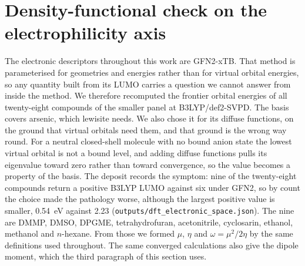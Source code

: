 \documentclass[11pt,a4paper]{article}
\begin{document}
\section{Density-functional check on the electrophilicity axis}
\label{meth:dft}

The electronic descriptors throughout this work are GFN2-xTB. That method is
parameterised for geometries and energies rather than for virtual orbital
energies, so any quantity built from its LUMO carries a question we cannot
answer from inside the method. We therefore recomputed the frontier orbital
energies of all twenty-eight compounds of the smaller panel at
B3LYP/def2-SVPD. The basis covers arsenic, which lewisite needs. We also
chose it for its diffuse functions, on the ground that virtual orbitals need
them, and that ground is the wrong way round. For a neutral closed-shell
molecule with no bound anion state the lowest virtual orbital is not a bound
level, and adding diffuse functions pulls its eigenvalue toward zero rather
than toward convergence, so the value becomes a property of the basis. The
deposit records the symptom: nine of the twenty-eight compounds return a
positive B3LYP LUMO against six under GFN2, so by count the choice made the
pathology worse, although the largest positive value is smaller, 0.54~eV
against 2.23 (\texttt{outputs/dft\_electronic\_space.json}). The nine are
DMMP, DMSO, DPGME, tetrahydrofuran, acetonitrile, cyclosarin, ethanol,
methanol and $n$-hexane. From those we
formed $\mu$, $\eta$ and $\omega = \mu^{2}/2\eta$ by the same definitions used
throughout. The same converged calculations also give the dipole moment, which
the third paragraph of this section uses.
\end{document}
